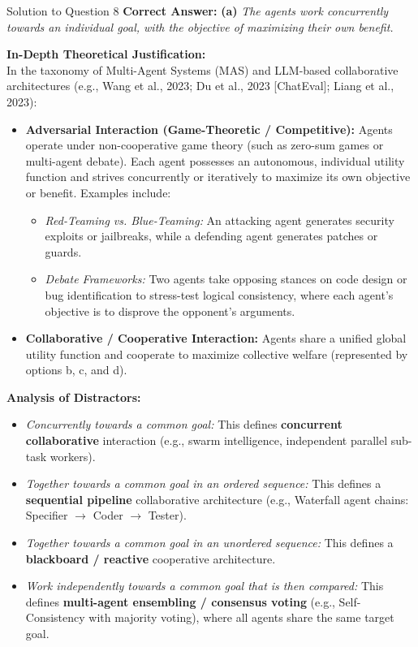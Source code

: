 \documentclass[11pt,a4paper]{article}
\begin{document}
\bigskip

\begin{solutionbox}{Solution to Question 8}
\textbf{Correct Answer:} \textbf{(a)} \textit{The agents work concurrently towards an individual goal, with the objective of maximizing their own benefit.}

\medskip
\textbf{In-Depth Theoretical Justification:}\\
In the taxonomy of Multi-Agent Systems (MAS) and LLM-based collaborative architectures (e.g., Wang et al., 2023; Du et al., 2023 [ChatEval]; Liang et al., 2023):
\begin{itemize}
    \item \textbf{Adversarial Interaction (Game-Theoretic / Competitive):} Agents operate under non-cooperative game theory (such as zero-sum games or multi-agent debate). Each agent possesses an autonomous, individual utility function and strives concurrently or iteratively to maximize its own objective or benefit. Examples include:
    \begin{itemize}
        \item \textit{Red-Teaming vs. Blue-Teaming:} An attacking agent generates security exploits or jailbreaks, while a defending agent generates patches or guards.
        \item \textit{Debate Frameworks:} Two agents take opposing stances on code design or bug identification to stress-test logical consistency, where each agent's objective is to disprove the opponent's arguments.
    \end{itemize}
    \item \textbf{Collaborative / Cooperative Interaction:} Agents share a unified global utility function and cooperate to maximize collective welfare (represented by options b, c, and d).
\end{itemize}

\medskip
\textbf{Analysis of Distractors:}
\begin{itemize}[leftmargin=1.5cm]
    \item[\textbf{(b)}] \textit{Concurrently towards a common goal:} This defines \textbf{concurrent collaborative} interaction (e.g., swarm intelligence, independent parallel sub-task workers).
    \item[\textbf{(c)}] \textit{Together towards a common goal in an ordered sequence:} This defines a \textbf{sequential pipeline} collaborative architecture (e.g., Waterfall agent chains: Specifier $\to$ Coder $\to$ Tester).
    \item[\textbf{(d)}] \textit{Together towards a common goal in an unordered sequence:} This defines a \textbf{blackboard / reactive} cooperative architecture.
    \item[\textbf{(e)}] \textit{Work independently towards a common goal that is then compared:} This defines \textbf{multi-agent ensembling / consensus voting} (e.g., Self-Consistency with majority voting), where all agents share the same target goal.
\end{itemize}
\end{solutionbox}
\end{document}
